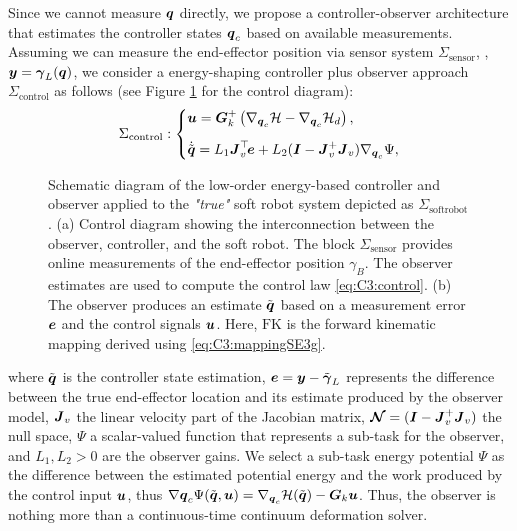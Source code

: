 Since we cannot measure ${\boldsymbol{q}}$ directly, we propose a controller-observer architecture that estimates the controller states ${\boldsymbol{q}}_c$ based on available measurements. Assuming we can measure the end-effector position via sensor system $\Sigma_{\textrm{sensor}}$, \ie, ${\boldsymbol{y}} = {\boldsymbol{\gamma}}_L({\boldsymbol{q}})$, we consider a energy-shaping controller plus observer approach $\Sigma_{\textrm{control}}$ as follows (see Figure \ref{fig:C3:diagram_control} for the control diagram):
\begin{align}
  \Sigma_{\textrm{control}}:
  \begin{dcases}
    \vspace{2mm}
    \uB  = \GB_k^+ \left( \nabla_{\vec{q}_c}{\Hm} - \nabla_{\vec{q}_c}{\Hm}_d \right), \\ 
    \dot{\tilde{\qB}} = L_1 \JB_v^\top\!\eB + L_2 (\IB - \JB_v^+\JB_v) \nabla_{\q_c} \Psi,
  \end{dcases}
\end{align}
%
%
\begin{figure}[!t]
  \vspace{-4mm}
  \centering
  
  \vspace{-2mm}
  \caption{\small Schematic diagram of the low-order energy-based controller and observer applied to the \textit{"true"} soft robot system depicted as $\Sigma_{\textrm{softrobot}}$. (a) Control diagram showing the interconnection between the observer, controller, and the soft robot. The block $\Sigma_{\textrm{sensor}}$ provides online measurements of the end-effector position $\gamma_B$. The observer estimates are used to compute the control law \eqref{eq:C3:control}. (b) The observer produces an estimate $\tilde{{\boldsymbol{q}}}$ based on a measurement error ${\boldsymbol{e}}$ and the control signals ${\boldsymbol{u}}$. Here, $\textrm{FK}$ is the forward kinematic mapping derived using \eqref{eq:C3:mappingSE3g}.}
  \label{fig:C3:diagram_control}
  \vspace{-3mm}
\end{figure}
%
where $\tilde{{\boldsymbol{q}}}$ is the controller state estimation, ${\boldsymbol{e}} = {\boldsymbol{y}} - \tilde{{\boldsymbol{\gamma}}}_L$ represents the difference between the true end-effector location and its estimate produced by the observer model, ${\boldsymbol{J}}_v$ the linear velocity part of the Jacobian matrix, $\boldsymbol{\mathcal{N}} = ({\boldsymbol{I}} - {\boldsymbol{J}}_v^+{\boldsymbol{J}}_v)$ the null space, $\Psi$ a scalar-valued function that represents a sub-task for the observer, and $L_1,L_2 > 0$ are the observer gains. We select a sub-task energy potential $\Psi$ as the difference between the estimated potential energy and the work produced by the control input ${\boldsymbol{u}}$, thus $\nabla{{\boldsymbol{q}}_c} \Psi(\tilde{{\boldsymbol{q}}},{\boldsymbol{u}}) = \nabla_{{\boldsymbol{q}}_c}\mathcal{H}(\tilde{{\boldsymbol{q}}}) - {\boldsymbol{G}}_k {\boldsymbol{u}}$. Thus, the observer is nothing more than a continuous-time continuum deformation solver.%
